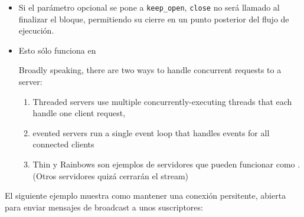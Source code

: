 \begin{itemize}
\item
Si el parámetro opcional se pone a \verb|keep_open|, 
\verb|close| no será llamado al finalizar el bloque,
permitiendo su cierre en un punto posterior del flujo de 
ejecución.

\item
Esto sólo funciona en   

Broadly speaking, there are two ways to handle concurrent requests
to a server: 
\begin{enumerate}
\item 
Threaded servers use multiple concurrently-executing
threads that each handle one client request,
\item 
evented servers
run a single event loop that handles events for all connected
clients
\item 
Thin y Rainbows son ejemplos de servidores que pueden funcionar como . 
(Otros servidores quizá cerrarán el stream)
\end{enumerate}
\end{itemize}



El siguiente ejemplo muestra como mantener una conexión persitente, abierta para enviar
mensajes de broadcast a unos suscriptores:

